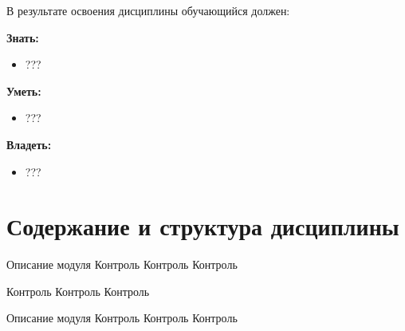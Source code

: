В результате освоения дисциплины обучающийся должен:

\textbf{Знать:}
	\begin{itemize}
		\item ???
	\end{itemize}

\textbf{Уметь:}
	\begin{itemize}
		\item ???
	\end{itemize}

\textbf{Владеть:}
	\begin{itemize}
		\item ???
	\end{itemize}

\section{Содержание и структура дисциплины}
	





\myunit
	{Описание модуля}
	{Контроль Контроль Контроль}

\myunit
	{\lipsum[3-4]}
	{Контроль Контроль Контроль}

\myunit
	{Описание модуля}
	{Контроль Контроль Контроль}



\printhours

